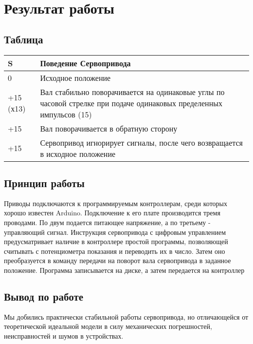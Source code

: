 \documentclass[12pt,a4paper]{scrartcl}
\begin{document}
\section{Результат работы}
\subsection{Таблица}

\begin{tabular}{|p{8cm}|p{8cm}|}
	\hline
\centering	S &  Поведение Сервопривода \\ \hline
0 & Исходное положение \\ \hline
+15 (х13) & Вал стабильно поворачивается на одинаковые углы по часовой стрелке при подаче одинаковых пределенных импульсов (15) \\ \hline
+15 & Вал поворачивается в обратную сторону \\ \hline
+15 & Сервопривод игнорирует сигналы, после чего возвращается в исходное положение  \\ \hline

\end{tabular}
\subsection{Принцип работы}
Приводы подключаются к программируемым контроллерам, среди которых хорошо известен Arduino. Подключение к его плате производится тремя проводами. По двум подается питающее напряжение, а по третьему - управляющий сигнал. Инструкция сервопривода с цифровым управлением предусматривает наличие в контроллере простой программы, позволяющей считывать с потенциометра показания и переводить их в число. Затем оно преобразуется в команду передачи на поворот вала сервопривода в заданное положение. Программа записывается на диске, а затем передается на контроллер

\subsection{Вывод по работе}
Мы добились практически стабильной работы сервопривода, но отличающейся от теоретической идеальной модели в силу механических погрешностей, неисправностей и шумов в устройствах.
\end{document}
